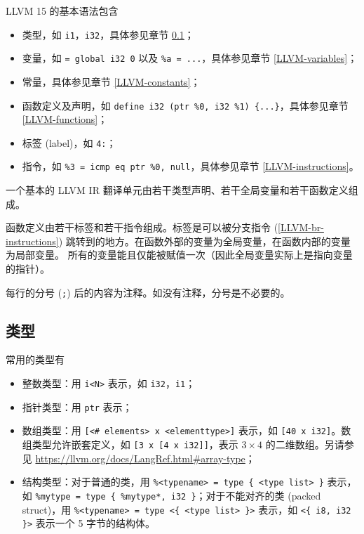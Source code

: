 LLVM 15 的基本语法包含
\begin{itemize}
  \item 类型，如 \texttt{i1}，\texttt{i32}，具体参见章节 \ref{LLVM-types}；
  \item 变量，如 \texttt{\@a = global i32 0} 以及
    \texttt{\%a = ...}，具体参见章节 \ref{LLVM-variables}；
  \item 常量，具体参见章节 \ref{LLVM-constants}；
  \item 函数定义及声明，如 \texttt{define i32 \@foo(ptr \%0, i32 \%1) \{...\}}，具体参见章节
    \ref{LLVM-functions}；
  \item 标签 (label)，如 \texttt{4:}；
  \item 指令，如 \texttt{\%3 = icmp eq ptr \%0, null}，具体参见章节
    \ref{LLVM-instructions}。
\end{itemize}

一个基本的 LLVM IR 翻译单元由若干类型声明、若干全局变量和若干函数定义组成。

函数定义由若干标签和若干指令组成。标签是可以被分支指令 (\ref{LLVM-br-instructions})
跳转到的地方。在函数外部的变量为全局变量，在函数内部的变量为局部变量。
所有的变量能且仅能被赋值一次（因此全局变量实际上是指向变量的指针）。

每行的分号 (\texttt{;}) 后的内容为注释。如没有注释，分号是不必要的。

\subsection{类型}\label{LLVM-types}

常用的类型有
\begin{itemize}
  \item 整数类型：用 \texttt{i<N>} 表示，如 \texttt{i32}，\texttt{i1}；
  \item 指针类型：用 \texttt{ptr} 表示；
  \item 数组类型：用 \texttt{[<\# elements> x <elementtype>]} 表示，如
    \texttt{[40 x i32]}。数组类型允许嵌套定义，如
    \texttt{[3 x [4 x i32]]}，表示 $3\times 4$ 的二维数组。另请参见
    \url{https://llvm.org/docs/LangRef.html#array-type}；
  \item 结构类型：对于普通的类，用 \texttt{\%<typename> = type \{ <type list> \}} 表示，如
    \texttt{\%mytype = type \{ \%mytype*, i32 \}}；对于不能对齐的类
    (packed struct)，用 \texttt{\%<typename> = type <\{ <type list> \}>}
    表示，如 \texttt{<\{ i8, i32 \}>} 表示一个 5 字节的结构体。
\end{itemize}

